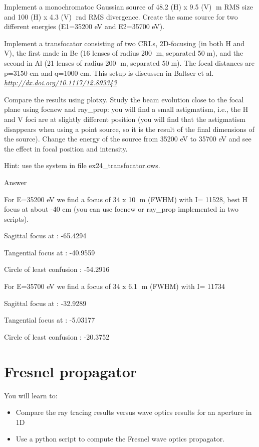 \documentclass[]{article}
\providecommand{\tightlist}{%
  \setlength{\itemsep}{0pt}\setlength{\parskip}{0pt}}
\begin{document}
Implement a monochromatoc Gaussian source of 48.2 (H) x 9.5 (V) m RMS
size and 100 (H) x 4.3 (V) rad RMS divergence. Create the same source
for two different energies (E1=35200 eV and E2=35700 eV).

Implement a transfocator consisting of two CRLs, 2D-focusing (in both H
and V), the first made in Be (16 lenses of radius 200 m, separated
50m), and the second in Al (21 lenses of radius 200 m, separated
50m). The focal distances are p=3150 cm and q=1000 cm. This setup is
discussen in Baltser et al.
\href{http://dx.doi.org/10.1117/12.893343}{\emph{\emph{http://dx.doi.org/10.1117/12.893343}}}

Compare the results using plotxy. Study the beam evolution close to the
focal plane using focnew and ray\_prop: you will find a small
astigmatism, i.e., the H and V foci are at slightly different position
(you will find that the astigmatism disappears when using a point
source, so it is the result of the final dimensions of the source).
Change the energy of the source from 35200 eV to 35700 eV and see the
effect in focal position and intensity.

Hint: use the system in file ex24\_transfocator.ows.

Answer

For E=35200 eV we find a focus of 34 x 10 m (FWHM) with I= 11528, best
H focus at about -40 cm (you can use focnew or ray\_prop implemented in
two scripts).

Sagittal focus at : -65.4294

Tangential focus at : -40.9559

Circle of least confusion : -54.2916

For E=35700 eV we find a focus of 34 x 6.1 m (FWHM) with I= 11734

Sagittal focus at : -32.9289

Tangential focus at : -5.03177

Circle of least confusion : -20.3752

\section{Fresnel propagator}\label{fresnel-propagator}

You will learn to:

\begin{itemize}
\tightlist
\item
  Compare the ray tracing results versus wave optics results for an
  aperture in 1D
\item
  Use a python script to compute the Fresnel wave optics propagator. 
\end{itemize}
\end{document}
